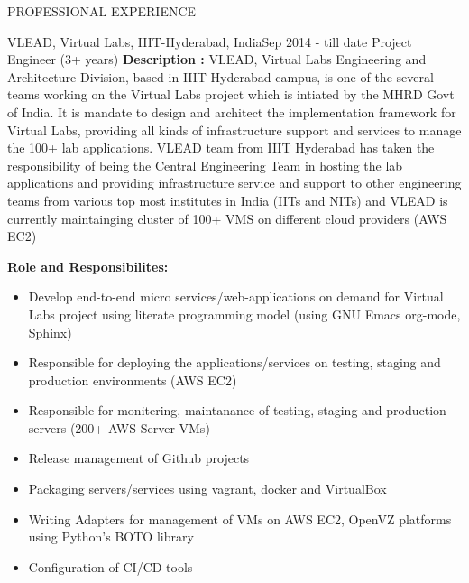 \documentclass{resume} %
\begin{document}
\begin{rSection}{PROFESSIONAL EXPERIENCE}

   \begin{rSubsection}
    {VLEAD, Virtual Labs, IIIT-Hyderabad, India}{Sep 2014 -
      till date} {Project Engineer} {(3+ years)} \hfill
    \break \textbf{Description :} VLEAD, Virtual Labs
    Engineering and Architecture Division, based in
    IIIT-Hyderabad campus, is one of the several teams
    working on the Virtual Labs project which is intiated by
    the MHRD Govt of India. It is mandate to design and
    architect the implementation framework for Virtual Labs,
    providing all kinds of infrastructure support and
    services to manage the 100+ lab applications. VLEAD team
    from IIIT Hyderabad has taken the responsibility of
    being the Central Engineering Team in hosting the lab
    applications and providing infrastructure service and
    support to other engineering teams from various top most
    institutes in India (IITs and NITs) and VLEAD is
    currently maintainging cluster of 100+ VMS on different
    cloud providers (AWS EC2) \\

    \break
    
    \textbf{Role and Responsibilites:}
    \begin{itemize}
      
    \item Develop end-to-end micro services/web-applications
      on demand for Virtual Labs project using literate
      programming model (using GNU Emacs org-mode, Sphinx)

    \item Responsible for deploying the
      applications/services on testing, staging and
      production environments (AWS EC2)

    \item Responsible for monitering, maintanance of
      testing, staging and production servers (200+ AWS
      Server VMs)

    \item Release management of Github projects
      
    \item Packaging servers/services using vagrant,
      docker and VirtualBox

    \item Writing Adapters for management of VMs on AWS EC2,
      OpenVZ platforms using Python's BOTO library

    \item Configuration of CI/CD tools
      

\end{itemize}
\end{rSubsection}
\end{rSection}
\end{document}
